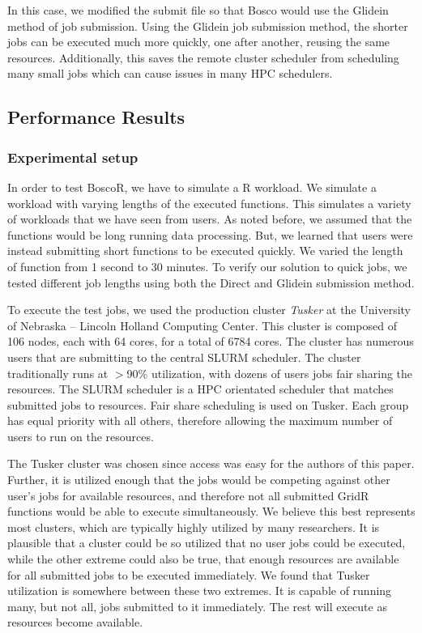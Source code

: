 In this case, we modified the submit file so that Bosco would use the Glidein method of job submission.  Using the Glidein job submission method, the shorter jobs can be executed much more quickly, one after another, reusing the same resources.  Additionally, this saves the remote cluster scheduler from scheduling many small jobs which can cause issues in many HPC schedulers.


\subsection{Performance Results}

\subsubsection{Experimental setup}  

In order to test BoscoR, we have to simulate a R workload.  We simulate a workload with varying lengths of the executed functions.  This simulates a variety of workloads that we have seen from users.  As noted before, we assumed that the functions would be long running data processing.  But, we learned that users were instead submitting short functions to be executed quickly.  We varied the length of function from 1 second to 30 minutes.  To verify our solution to quick jobs, we tested different job lengths using both the Direct and Glidein submission method.

To execute the test jobs, we used the production cluster \textit{Tusker} at the University of Nebraska -- Lincoln Holland Computing Center.  This cluster is composed of 106 nodes, each with 64 cores, for a total of 6784 cores.  The cluster has numerous users that are submitting to the central SLURM \cite{yoo2003slurm} scheduler.  The cluster traditionally runs at $>$90\% utilization, with dozens of users jobs fair sharing the resources.  The SLURM scheduler is a HPC orientated scheduler that matches submitted jobs to resources.  Fair share scheduling is used on Tusker.  Each group has equal priority with all others, therefore allowing the maximum number of users to run on the resources.

The Tusker cluster was chosen since access was easy for the authors of this paper.  Further, it is utilized enough that the jobs would be competing against other user's jobs for available resources, and therefore not all submitted GridR functions would be able to execute simultaneously.  We believe this best represents most clusters, which are typically highly utilized by many researchers.  It is plausible that a cluster could be so utilized that no user jobs could be executed, while the other extreme could also be true, that enough resources are available for all submitted jobs to be executed immediately.  We found that Tusker utilization is somewhere between these two extremes.  It is capable of running many, but not all, jobs submitted to it immediately.  The rest will execute as resources become available.

